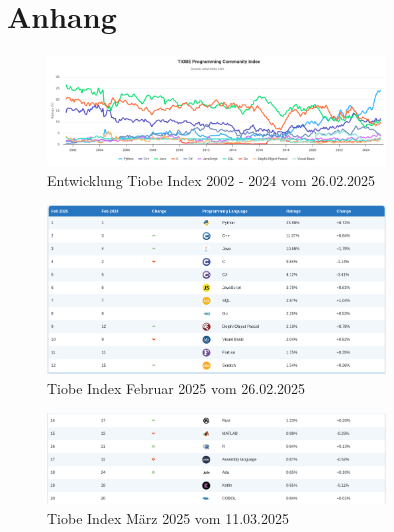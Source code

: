 \documentclass[11pt]{article}
\begin{document}
    \printbibliography[
        heading=bibintoc,
        title={Literaturverzeichnis}
    ]
    \appendix


    \section{Anhang}

    \begin{figure}[h]
        \centering
        \includegraphics[width=0.8\textwidth]{pictures/Screenshot 2025-02-26 at 19-53-49 TIOBE Index - TIOBE}
        \caption{Entwicklung Tiobe Index 2002 - 2024 vom 26.02.2025 }
        \label{fig:entwicklung-tiobe}
    \end{figure}

    \begin{figure}[h]
        \centering
        \includegraphics[width=0.8\textwidth]{pictures/Screenshot 2025-02-26 at 19-54-42 TIOBE Index - TIOBE}
        \caption{Tiobe Index Februar 2025 vom 26.02.2025}
        \label{fig:tiobe-java-2025}
    \end{figure}

    \begin{figure}[h]
        \centering
        \includegraphics[width=0.8\textwidth]{pictures/Screenshot 2025-03-11 at 22-21-04 TIOBE Index - TIOBE}
        \caption{Tiobe Index März 2025 vom 11.03.2025}
        \label{fig:tiobe-kotlin-2025}
    \end{figure}
\end{document}
